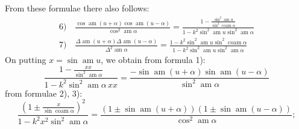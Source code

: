 \documentclass{article}
\begin{document}
From these formulae there also follows:
\[
\begin{gathered}
\text{6)}\quad\frac{\cos\operatorname{am}(u+\alpha)\cos\operatorname{am}(u-\alpha)}{\cos^{2}\operatorname{am}\alpha}=\frac{1-\frac{\sin^{2}\operatorname{am}u}{\sin^{2}\operatorname{coam}\alpha}}{1-k^{2}\sin^{2}\operatorname{am}u\sin^{2}\operatorname{am}\alpha}\\[1.5ex]
\text{7)}\quad\frac{\Delta\operatorname{am}(u+\alpha)\Delta\operatorname{am}(u-\alpha)}{\Delta^{2}\operatorname{am}\alpha}=\frac{1-k^{2}\sin^{2}\operatorname{am}u\sin^{2}\operatorname{coam}\alpha}{1-k^{2}\sin^{2}\operatorname{am}u\sin^{2}\operatorname{am}\alpha}
\end{gathered}
\]
On putting $x=\sin\operatorname{am}u$, we obtain from formula 1):
\[
\frac{1-\frac{xx}{\sin^{2}\operatorname{am}\alpha}}{1-k^{2}\sin^{2}\operatorname{am}\alpha\,xx}=\frac{-\sin\operatorname{am}(u+\alpha)\sin\operatorname{am}(u-\alpha)}{\sin^{2}\operatorname{am}\alpha}
\]
from formulae 2), 3):
\[
\frac{\left(1\pm\frac{x}{\sin\operatorname{coam}\alpha}\right)^{2}}{1-k^{2}x^{2}\sin^{2}\operatorname{am}\alpha}=\frac{\left(1\pm\sin\operatorname{am}(u+\alpha)\right)\left(1\pm\sin\operatorname{am}(u-\alpha)\right)}{\cos^{2}\operatorname{am}\alpha};
\]
\end{document}
